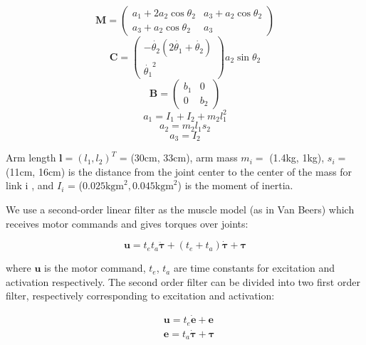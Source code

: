 \begin{equation}
\bm{M} = \left( \begin{matrix} a_1 + 2a_2\cos\theta_2  &  a_3 + a_2 \cos\theta_2 \\
a_3 + a_2 \cos\theta_2   &  a_3
\end{matrix}\right)
\end{equation}
\begin{equation}
\bm{C} = \left( \begin{matrix} -\dot{\theta_2}(2\dot{\theta_1}+\dot{\theta_2}) \\
\dot{\theta_1}^2	\end{matrix} \right)
a_2\sin{\theta_2}
\end{equation}
\begin{equation}
\bm{B} = \left( \begin{matrix} b_1  & 0 \\ 0 & b_2 \end{matrix} \right)
\end{equation}
\begin{equation}
a_1 = I_1 + I_2 + m_2 l_1^2
\end{equation}
\begin{equation}
a_2 = m_2 l_1 s_2
\end{equation}
\begin{equation}
a_3 = I_2
\end{equation}

Arm length $\bm{l} = (l_1, l_2)^T$ = (30cm, 33cm), arm mass $m_i =$ (1.4kg, 1kg), $s_i=$ (11cm, 16cm) is the distance from the joint center to the center of the mass for link i , and $I_i$ = ($0.025\text{kgm}^2, 0.045\text{kgm}^2$) is the moment of inertia.

We use a second-order linear filter as the muscle model (as in Van Beers) which receives motor commands and gives torques over joints:

\begin{equation}
\bm{u} = t_et_a\ddot{\bm{\tau}} + (t_e+t_a)\dot{\bm{\tau}} +\bm{\tau}
\end{equation}

where $\bm{u}$ is the motor command, $t_e$, $t_a$ are time constants for excitation and activation respectively. 
The second order filter can be divided into two first order filter, respectively corresponding to excitation and activation:

\begin{equation}
\begin{split}
& \bm{u} = t_e \dot{\bm{e}} + \bm{e} \\
& \bm{e} = t_a \dot{\bm{\tau}} + \bm{\tau}
\end{split}
\end{equation}

